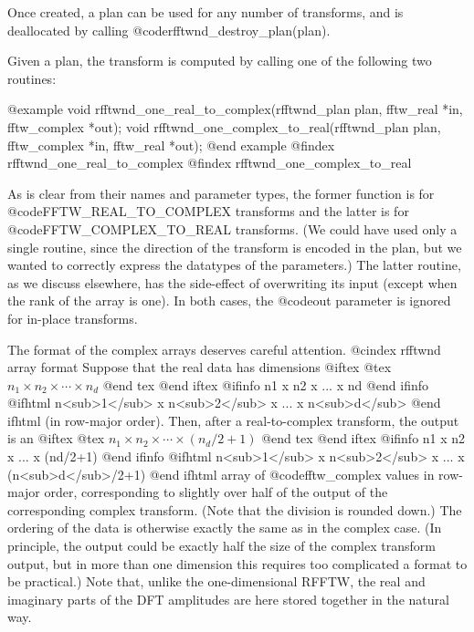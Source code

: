 Once created, a plan can be used for any number of transforms, and is
deallocated by calling @code{rfftwnd_destroy_plan(plan)}.

Given a plan, the transform is computed by calling one of the following
two routines:

@example
void rfftwnd_one_real_to_complex(rfftwnd_plan plan,
                                 fftw_real *in, fftw_complex *out);
void rfftwnd_one_complex_to_real(rfftwnd_plan plan,
                                 fftw_complex *in, fftw_real *out);
@end example
@findex rfftwnd_one_real_to_complex
@findex rfftwnd_one_complex_to_real

As is clear from their names and parameter types, the former function is
for @code{FFTW_REAL_TO_COMPLEX} transforms and the latter is for
@code{FFTW_COMPLEX_TO_REAL} transforms.  (We could have used only a
single routine, since the direction of the transform is encoded in the
plan, but we wanted to correctly express the datatypes of the
parameters.)  The latter routine, as we discuss elsewhere, has the
side-effect of overwriting its input (except when the rank of the array
is one).  In both cases, the @code{out} parameter is ignored for
in-place transforms.

The format of the complex arrays deserves careful attention.
@cindex rfftwnd array format
Suppose that the real data has dimensions
@iftex
@tex
$n_1 \times n_2 \times \cdots \times n_d$
@end tex
@end iftex
@ifinfo
n1 x n2 x ... x nd
@end ifinfo
@ifhtml
n<sub>1</sub> x n<sub>2</sub> x ... x n<sub>d</sub>
@end ifhtml
(in row-major order).  Then, after a real-to-complex transform, the
output is an
@iftex
@tex
$n_1 \times n_2 \times \cdots \times (n_d/2+1)$
@end tex
@end iftex
@ifinfo
n1 x n2 x ... x (nd/2+1)
@end ifinfo
@ifhtml
n<sub>1</sub> x n<sub>2</sub> x ... x (n<sub>d</sub>/2+1)
@end ifhtml
array of @code{fftw_complex} values in row-major order, corresponding to
slightly over half of the output of the corresponding complex transform.
(Note that the division is rounded down.)  The ordering of the data is
otherwise exactly the same as in the complex case.  (In principle, the
output could be exactly half the size of the complex transform output,
but in more than one dimension this requires too complicated a format to
be practical.)  Note that, unlike the one-dimensional RFFTW, the real
and imaginary parts of the DFT amplitudes are here stored together in
the natural way.


